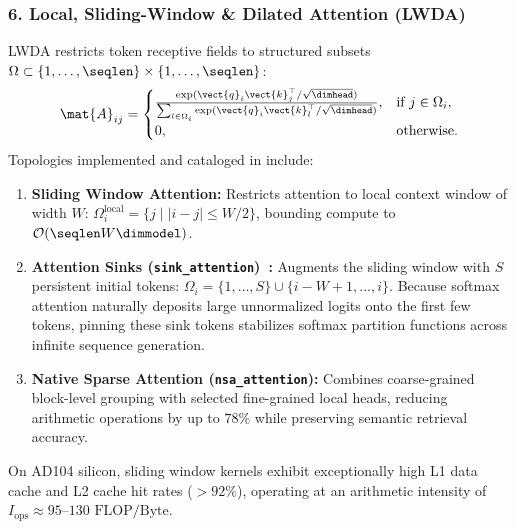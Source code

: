 \subsubsection{6. Local, Sliding-Window \& Dilated Attention (LWDA)}
\label{subsubsec:lwda_contract}
LWDA restricts token receptive fields to structured subsets $\Omega \subset \{1, \dots, \seqlen\} \times \{1, \dots, \seqlen\}$:
\begin{equation}
\mat{A}_{ij} = \begin{cases} \frac{\exp(\vect{q}_i \vect{k}_j^\top / \sqrt{\dimhead})}{\sum_{l \in \Omega_i} \exp(\vect{q}_i \vect{k}_l^\top / \sqrt{\dimhead})}, & \text{if } j \in \Omega_i, \\ 0, & \text{otherwise}. \end{cases}
\end{equation}
Topologies implemented and cataloged in \neuralops{} include:
\begin{enumerate}
\item \textbf{Sliding Window Attention:} Restricts attention to local context window of width $W$: $\Omega_i^{\text{local}} = \{j \mid |i - j| \le W/2\}$, bounding compute to $\mathcal{O}(\seqlen W \dimmodel)$.
\item \textbf{Attention Sinks (\texttt{sink\_attention})~\cite{xiao2023smoothquant,xiao2024streamingllm}:} Augments the sliding window with $S$ persistent initial tokens: $\Omega_i = \{1, \dots, S\} \cup \{i - W + 1, \dots, i\}$. Because softmax attention naturally deposits large unnormalized logits onto the first few tokens, pinning these sink tokens stabilizes softmax partition functions across infinite sequence generation.
\item \textbf{Native Sparse Attention (\texttt{nsa\_attention}):} Combines coarse-grained block-level grouping with selected fine-grained local heads, reducing arithmetic operations by up to $78\%$ while preserving semantic retrieval accuracy.
\end{enumerate}
On AD104 silicon, sliding window kernels exhibit exceptionally high L1 data cache and L2 cache hit rates ($>92\%$), operating at an arithmetic intensity of $I_{\text{ops}} \approx 95\text{--}130\text{ FLOP/Byte}$.

